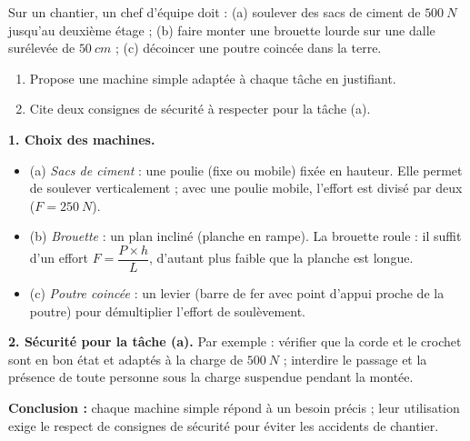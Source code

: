 \documentclass[11pt]{article}
\newcommand{\cle}[1]{{\popxbold\color{popdark}#1}}
\begin{document}
\begin{exoresolu}
Sur un chantier, un chef d'équipe doit : (a) soulever des sacs de ciment de $\SI{500}{N}$ jusqu'au deuxième étage ; (b) faire monter une brouette lourde sur une dalle surélevée de $\SI{50}{cm}$ ; (c) décoincer une poutre coincée dans la terre.
\begin{enumerate}
\item Propose une machine simple adaptée à chaque tâche en justifiant.
\item Cite deux consignes de sécurité à respecter pour la tâche (a).
\end{enumerate}
\tcblower
\textbf{1. Choix des machines.}
\begin{itemize}
\item (a) \emph{Sacs de ciment} : une \cle{poulie} (fixe ou mobile) fixée en hauteur. Elle permet de soulever verticalement ; avec une poulie mobile, l'effort est divisé par deux ($F = \SI{250}{N}$).
\item (b) \emph{Brouette} : un \cle{plan incliné} (planche en rampe). La brouette roule : il suffit d'un effort $F = \dfrac{P \times h}{L}$, d'autant plus faible que la planche est longue.
\item (c) \emph{Poutre coincée} : un \cle{levier} (barre de fer avec point d'appui proche de la poutre) pour démultiplier l'effort de soulèvement.
\end{itemize}

\textbf{2. Sécurité pour la tâche (a).} Par exemple : vérifier que la corde et le crochet sont en bon état et adaptés à la charge de $\SI{500}{N}$ ; interdire le passage et la présence de toute personne sous la charge suspendue pendant la montée.

\textbf{Conclusion :} chaque machine simple répond à un besoin précis ; leur utilisation exige le respect de consignes de sécurité pour éviter les accidents de chantier.
\end{exoresolu}
\end{document}
